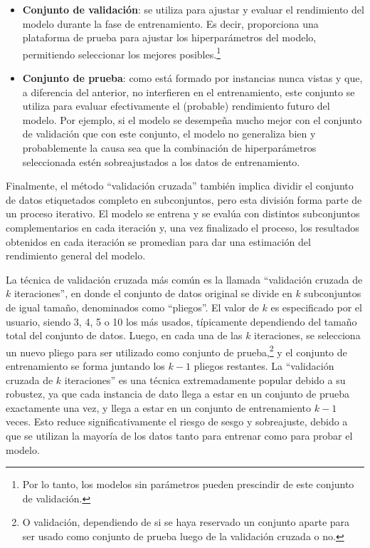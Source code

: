 \begin{itemize}
    \item \textbf{Conjunto de validación}: se utiliza para ajustar y evaluar el rendimiento del modelo durante la fase de entrenamiento. Es decir, proporciona una plataforma de prueba para ajustar los hiperparámetros del modelo, permitiendo seleccionar los mejores posibles.\footnote{Por lo tanto, los modelos sin parámetros pueden prescindir de este conjunto de validación.}
    \item \textbf{Conjunto de prueba}: como está formado por instancias nunca vistas y que, a diferencia del anterior, no interfieren en el entrenamiento, este conjunto se utiliza para evaluar efectivamente el (probable) rendimiento futuro del modelo. Por ejemplo, si el modelo se desempeña mucho mejor con el conjunto de validación que con este conjunto, el modelo no generaliza bien y probablemente la causa sea que la combinación de hiperparámetros seleccionada estén sobreajustados a los datos de entrenamiento.
\end{itemize}

Finalmente, el método ``validación cruzada'' también implica dividir el conjunto de datos etiquetados completo en subconjuntos, pero esta división forma parte de un proceso iterativo. El modelo se entrena y se evalúa con distintos subconjuntos complementarios en cada iteración y, una vez finalizado el proceso, los resultados obtenidos en cada iteración se promedian para dar una estimación del rendimiento general del modelo\cite{seni2010ensemble}.

La técnica de validación cruzada más común es la llamada ``validación cruzada de $k$ iteraciones'', en donde el conjunto de datos original se divide en $k$ subconjuntos de igual tamaño, denominados como ``pliegos''. El valor de $k$ es especificado por el usuario, siendo 3, 4, 5 o 10 los más usados, típicamente dependiendo del tamaño total del conjunto de datos.
Luego, en cada una de las $k$ iteraciones, se selecciona un nuevo pliego para ser utilizado como conjunto de prueba,\footnote{O validación, dependiendo de si se haya reservado un conjunto aparte para ser usado como conjunto de prueba luego de la validación cruzada o no.} y el conjunto de entrenamiento se forma juntando los $k-1$ pliegos restantes.
La ``validación cruzada de $k$ iteraciones'' es una técnica extremadamente popular debido a su robustez, ya que cada instancia de dato llega a estar en un conjunto de prueba exactamente una vez, y llega a estar en un conjunto de entrenamiento $k-1$ veces. Esto reduce significativamente el riesgo de sesgo y sobreajuste, debido a que se utilizan la mayoría de los datos tanto para entrenar como para probar el modelo. 

